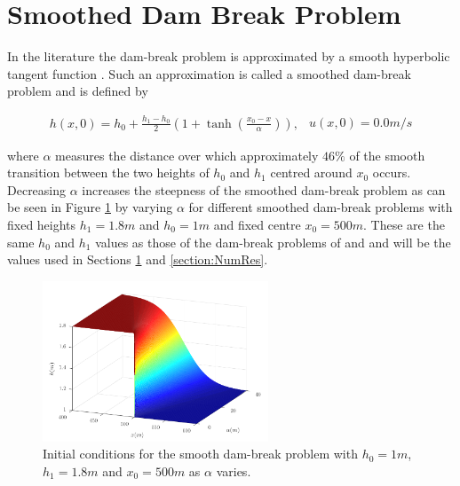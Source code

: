 \documentclass[times]{elsarticle}
\begin{document}
\section{Smoothed Dam Break Problem}
\label{section:smootheddambreak}
In the literature the dam-break problem is approximated by a smooth hyperbolic tangent function \cite{Mitsotakis-etal-2014,Mitsotakis-etal-2017}. Such an approximation is called a smoothed dam-break problem and is defined by
\begin{linenomath*}
\begin{subequations}
\begin{gather}
h(x,0) = h_0 + \frac{h_1 - h_0}{2}\left(1 + \tanh\left(\frac{x_0 - x}{\alpha}\right)\right),
\end{gather}
\begin{gather}
u(x,0) = 0.0m/s
\end{gather}
\label{eq:sdbi}
\end{subequations}
\end{linenomath*}
where $\alpha$ measures the distance over which approximately $46\%$ of the smooth transition between the two heights of $h_0$ and $h_1$ centred around $x_0$ occurs. Decreasing $\alpha$ increases the steepness of the smoothed dam-break problem as can be seen in Figure \ref{fig:dbsmoothinit} by varying $\alpha$ for different smoothed dam-break problems with fixed heights $h_1 =1.8m$ and $h_0 = 1m$ and fixed centre $x_0 = 500m$. These are the same $h_0$ and $h_1$ values as those of the dam-break problems of \citet{El-etal-2006} and \citet {Hank-etal-2010-2034} and will be the values used in Sections \ref{section:smootheddambreak} and \ref{section:NumRes}.
\begin{figure}
\centering
\includegraphics[width=0.6\textwidth]{pics/explainers/dbs.pdf}
\caption{Initial conditions for the smooth dam-break problem with $h_0 = 1m$, $h_1 = 1.8m$ and $x_0 =500m$ as $\alpha$ varies.}
\label{fig:dbsmoothinit}
\end{figure}
%
\end{document}
